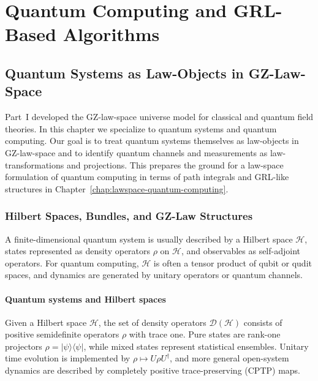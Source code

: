 \documentclass[11pt]{book}
\theoremstyle{plain}
\theoremstyle{definition}
\theoremstyle{remark}
\begin{document}
\part[Quantum Computing and GRL-Based Algorithms]{Quantum Computing and GRL-Based Algorithms}

\chapter[Quantum Systems as Law-Objects]{Quantum Systems as Law-Objects in GZ-Law-Space}
\label{chap:quantum-law-objects}


Part~I developed the GZ-law-space universe model for classical and
quantum field theories. In this chapter we specialize to quantum
systems and quantum computing. Our goal is to treat quantum systems
themselves as law-objects in GZ-law-space and to identify quantum
channels and measurements as law-transformations and projections.
This prepares the ground for a law-space formulation of quantum
computing in terms of path integrals and GRL-like structures in
Chapter~\ref{chap:lawspace-quantum-computing}.

\section{Hilbert Spaces, Bundles, and GZ-Law Structures}
\label{sec:q-hilbert-bundles}


A finite-dimensional quantum system is usually described by a
Hilbert space $\mathcal{H}$, states represented as density
operators $\rho$ on $\mathcal{H}$, and observables as self-adjoint
operators. For quantum computing, $\mathcal{H}$ is often a tensor
product of qubit or qudit spaces, and dynamics are generated by
unitary operators or quantum channels.

\subsection*{Quantum systems and Hilbert spaces}

Given a Hilbert space $\mathcal{H}$, the set of density operators
$\mathcal{D}(\mathcal{H})$ consists of positive semidefinite
operators $\rho$ with trace one. Pure states are rank-one projectors
$\rho = \lvert\psi\rangle\langle\psi\rvert$, while mixed states represent
statistical ensembles. Unitary time evolution is implemented by
$\rho \mapsto U \rho U^\dagger$, and more general open-system
dynamics are described by completely positive trace-preserving
(CPTP) maps.
\end{document}
